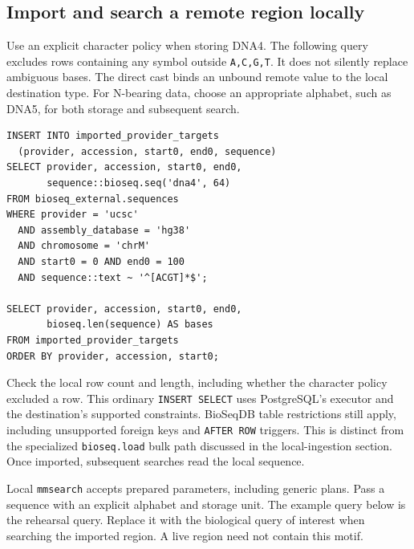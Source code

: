 \subsection{Import and search a remote region locally}

Use an explicit character policy when storing DNA4. The following query
excludes rows containing any symbol outside \texttt{A,C,G,T}. It does not
silently replace ambiguous bases. The direct cast binds an unbound remote
value to the local destination type. For N-bearing data, choose an
appropriate alphabet, such as DNA5, for both storage and subsequent search.

\par\noindent\begin{minipage}{\linewidth}
\begin{lstlisting}[style=bioseq-appendix-sql]
INSERT INTO imported_provider_targets
  (provider, accession, start0, end0, sequence)
SELECT provider, accession, start0, end0,
       sequence::bioseq.seq('dna4', 64)
FROM bioseq_external.sequences
WHERE provider = 'ucsc'
  AND assembly_database = 'hg38'
  AND chromosome = 'chrM'
  AND start0 = 0 AND end0 = 100
  AND sequence::text ~ '^[ACGT]*$';

SELECT provider, accession, start0, end0,
       bioseq.len(sequence) AS bases
FROM imported_provider_targets
ORDER BY provider, accession, start0;
\end{lstlisting}
\end{minipage}

Check the local row count and length, including whether the character policy
excluded a row. This ordinary \texttt{INSERT SELECT} uses PostgreSQL's
executor and the destination's supported constraints. BioSeqDB table
restrictions still apply, including unsupported foreign keys and
\texttt{AFTER ROW} triggers. This is distinct from the specialized
\texttt{bioseq.load} bulk path discussed in the local-ingestion section.
Once imported, subsequent searches read the local sequence.

Local \texttt{mmsearch} accepts prepared parameters, including generic plans.
Pass a sequence with an explicit alphabet and storage unit. The example query
below is the rehearsal query. Replace it with the biological query of interest
when searching the imported region. A live region need not contain this motif.

